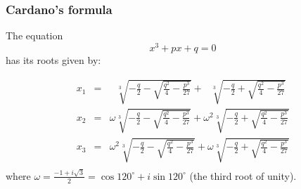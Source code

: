 \begin{frame}
\frametitle{Cardano's formula}
\begin{theorem}
The equation 
\[
x^3+px+q=0
\]
has its roots given by:

\[
\begin{array}{rcl}
x_1 &=&\displaystyle  ~~~ \sqrt[3]{-\frac{q}{2}-\sqrt{\frac{q^2}{4}-\frac{p^3}{27}}}+~~~\sqrt[3]{-\frac{q}{2}+ \sqrt{\frac{q^2}{4}-\frac{p^3}{27}}}\\
x_2 &=&\displaystyle \omega  \sqrt[3]{-\frac{q}{2}-\sqrt{\frac{q^2}{4}-\frac{p^3}{27}}}+\omega^2 \sqrt[3]{-\frac{q}{2} + \sqrt{\frac{q^2}{4}-\frac{p^3}{27}}}\\
x_3 &=&\displaystyle  \omega^2 \sqrt[3]{-\frac{q}{2}-\sqrt{\frac{q^2}{4}-\frac{p^3}{27}}}+\omega \sqrt[3]{-\frac{q}{2}+\sqrt{\frac{q^2}{4}-\frac{p^3}{27}}}\\
\end{array}
\]
where $\omega =\displaystyle \frac{-1+i\sqrt{3}}{2} = \cos 120^\circ + i \sin 120^\circ$  (the third root of unity).
\end{theorem}	
\end{frame}